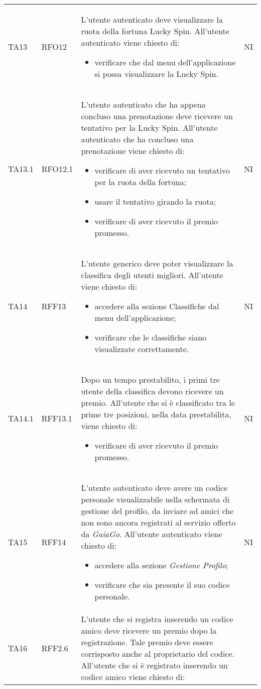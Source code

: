 \begin{longtable}{ >{\centering}p{} >{\centering}p{} >{\centering}p{}
			>{\centering}p{}}
		TA13 & RFO12 &	L'utente autenticato deve visualizzare la ruota della fortuna Lucky Spin\glo. All'utente autenticato viene chiesto di:
		 \begin{itemize}
		 	\item verificare che dal menu dell'applicazione si possa visualizzare la Lucky Spin.
		 \end{itemize}	&	NI	\tabularnewline		 
		 TA13.1	& RFO12.1 &	L'utente autenticato che ha appena concluso una prenotazione deve ricevere un tentativo per la Lucky Spin\glo. All'utente autenticato che ha concluso una prenotazione viene chiesto di:
		 \begin{itemize}
		 	\item verificare di aver ricevuto un tentativo per la ruota della fortuna;
		 	\item usare il tentativo girando la ruota;
		 	\item verificare di aver ricevuto il premio promesso.
		 \end{itemize}	&	NI	\tabularnewline	
		 TA14	& RFF13 &	L'utente generico deve poter visualizzare la classifica degli utenti migliori. All'utente viene chiesto di:
		 \begin{itemize}
		 	\item accedere alla sezione Classifiche dal menu dell'applicazione;
		 	\item verificare che le classifiche siano visualizzate correttamente.
		 \end{itemize}	&	NI	\tabularnewline	
		 TA14.1	& RFF13.1 & Dopo un tempo prestabilito, i primi tre utente della classifica devono ricevere un premio. All'utente che si è classificato tra le prime tre posizioni, nella data prestabilita, viene chiesto di:
		 \begin{itemize}
		 	\item verificare di aver ricevuto il premio promesso.
		 \end{itemize}	&	NI	\tabularnewline	
		 TA15	& RFF14 &	L'utente autenticato deve avere un codice personale visualizzabile nella schermata di gestione del profilo, da inviare ad amici che non sono ancora registrati al servizio offerto da \textit{GaiaGo}.  All'utente autenticato viene chiesto di:
		 \begin{itemize}
		 	\item accedere alla sezione \textit{Gestione Profilo};
		 	\item verificare che sia presente il suo codice personale.
		 \end{itemize}	&	NI	\tabularnewline
		 TA16	& RFF2.6 & 	L'utente che si registra inserendo un codice amico deve ricevere un premio dopo la registrazione. Tale premio deve essere corrisposto anche al proprietario del codice. All'utente che si è registrato inserendo un codice amico viene chiesto di:

\end{longtable}
